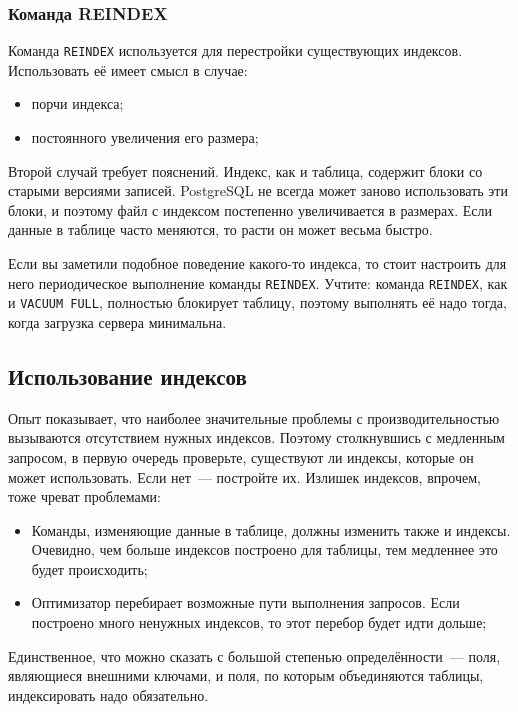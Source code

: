 \subsubsection{Команда REINDEX}

Команда \lstinline!REINDEX! используется для перестройки существующих индексов. Использовать её имеет смысл в случае:

\begin{itemize}
  \item порчи индекса;
  \item постоянного увеличения его размера;
\end{itemize}

Второй случай требует пояснений. Индекс, как и таблица, содержит блоки со старыми версиями записей. PostgreSQL не всегда может заново использовать эти блоки, и поэтому файл с индексом постепенно увеличивается в размерах. Если данные в таблице часто меняются, то расти он может весьма быстро.

Если вы заметили подобное поведение какого-то индекса, то стоит настроить для него периодическое выполнение команды \lstinline!REINDEX!. Учтите: команда \lstinline!REINDEX!, как и \lstinline!VACUUM FULL!, полностью блокирует таблицу, поэтому выполнять её надо тогда, когда загрузка сервера минимальна.


\subsection{Использование индексов}

Опыт показывает, что наиболее значительные проблемы с производительностью вызываются отсутствием нужных индексов. Поэтому столкнувшись с медленным запросом, в первую очередь проверьте, существуют ли индексы, которые он может использовать. Если нет~--- постройте их. Излишек индексов, впрочем, тоже чреват проблемами:

\begin{itemize}
  \item Команды, изменяющие данные в таблице, должны изменить также и индексы. Очевидно, чем больше индексов построено для таблицы, тем медленнее это будет происходить;
  \item Оптимизатор перебирает возможные пути выполнения запросов. Если построено много ненужных индексов, то этот перебор будет идти дольше;
\end{itemize}

Единственное, что можно сказать с большой степенью определённости~--- поля, являющиеся внешними ключами, и поля, по которым объединяются таблицы, индексировать надо обязательно.



